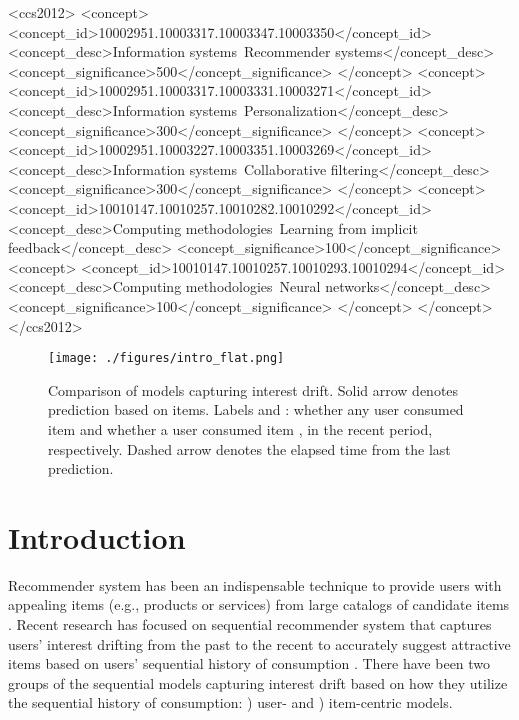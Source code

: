 \documentclass[sigconf]{acmart}
\begin{document}
\begin{CCSXML}
<ccs2012>
<concept>
<concept_id>10002951.10003317.10003347.10003350</concept_id>
<concept_desc>Information systems~Recommender systems</concept_desc>
<concept_significance>500</concept_significance>
</concept>
<concept>
<concept_id>10002951.10003317.10003331.10003271</concept_id>
<concept_desc>Information systems~Personalization</concept_desc>
<concept_significance>300</concept_significance>
</concept>
<concept>
<concept_id>10002951.10003227.10003351.10003269</concept_id>
<concept_desc>Information systems~Collaborative filtering</concept_desc>
<concept_significance>300</concept_significance>
</concept>
<concept>
<concept_id>10010147.10010257.10010282.10010292</concept_id>
<concept_desc>Computing methodologies~Learning from implicit feedback</concept_desc>
<concept_significance>100</concept_significance>
<concept>
<concept_id>10010147.10010257.10010293.10010294</concept_id>
<concept_desc>Computing methodologies~Neural networks</concept_desc>
<concept_significance>100</concept_significance>
</concept>
</concept>
</ccs2012>
\end{CCSXML}







\maketitle

\begin{figure}[t]
	\centering
	\texttt{[image: ./figures/intro\_flat.png]}
	\caption{Comparison of models capturing interest drift. Solid arrow denotes prediction based on items.
	Labels  and : whether any user consumed item  and whether a user  consumed item , in the recent period, respectively. Dashed arrow denotes the elapsed time from the last prediction.}
	\label{fig:intro}
\end{figure}

\section{Introduction}
Recommender system has been an indispensable technique to provide users with appealing items (e.g., products or services) from large catalogs of candidate items \cite{adomavicius2005toward}. Recent research has focused on sequential recommender system that captures users' interest drifting from the past to the recent to accurately suggest attractive items based on users' sequential history of consumption \cite{kang2018self,ma2019hierarchical,hyun2020interest,li2021lightweight}. 
There have been two groups of the sequential models capturing interest drift based on how they utilize the sequential history of consumption:  {}) user- and {}) item-centric models.  
\end{document}

